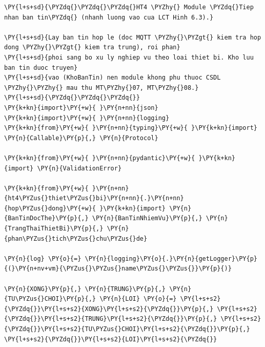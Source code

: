 \begin{Verbatim}[commandchars=\\\{\},frame=single,framerule=0.3pt,rulecolor=\color{black!40},fontsize=\footnotesize,breaklines=true]
\PY{l+s+sd}{\PYZdq{}\PYZdq{}\PYZdq{}HT4 \PYZhy{} Module \PYZdq{}Tiep nhan ban tin\PYZdq{} (nhanh luong vao cua LCT Hinh 6.3).}

\PY{l+s+sd}{Lay ban tin hop le (doc MQTT \PYZhy{}\PYZgt{} kiem tra hop dong \PYZhy{}\PYZgt{} kiem tra trung), roi phan}
\PY{l+s+sd}{phoi sang bo xu ly nghiep vu theo loai thiet bi. Kho luu ban tin duoc truyen}
\PY{l+s+sd}{vao (KhoBanTin) nen module khong phu thuoc CSDL \PYZhy{}\PYZhy{} mau thu MT\PYZhy{}07, MT\PYZhy{}08.}
\PY{l+s+sd}{\PYZdq{}\PYZdq{}\PYZdq{}}
\PY{k+kn}{import}\PY{+w}{ }\PY{n+nn}{json}
\PY{k+kn}{import}\PY{+w}{ }\PY{n+nn}{logging}
\PY{k+kn}{from}\PY{+w}{ }\PY{n+nn}{typing}\PY{+w}{ }\PY{k+kn}{import} \PY{n}{Callable}\PY{p}{,} \PY{n}{Protocol}

\PY{k+kn}{from}\PY{+w}{ }\PY{n+nn}{pydantic}\PY{+w}{ }\PY{k+kn}{import} \PY{n}{ValidationError}

\PY{k+kn}{from}\PY{+w}{ }\PY{n+nn}{ht4\PYZus{}thiet\PYZus{}bi}\PY{n+nn}{.}\PY{n+nn}{hop\PYZus{}dong}\PY{+w}{ }\PY{k+kn}{import} \PY{n}{BanTinDocThe}\PY{p}{,} \PY{n}{BanTinNhiemVu}\PY{p}{,} \PY{n}{TrangThaiThietBi}\PY{p}{,} \PY{n}{phan\PYZus{}tich\PYZus{}chu\PYZus{}de}

\PY{n}{log} \PY{o}{=} \PY{n}{logging}\PY{o}{.}\PY{n}{getLogger}\PY{p}{(}\PY{n+nv+vm}{\PYZus{}\PYZus{}name\PYZus{}\PYZus{}}\PY{p}{)}

\PY{n}{XONG}\PY{p}{,} \PY{n}{TRUNG}\PY{p}{,} \PY{n}{TU\PYZus{}CHOI}\PY{p}{,} \PY{n}{LOI} \PY{o}{=} \PY{l+s+s2}{\PYZdq{}}\PY{l+s+s2}{XONG}\PY{l+s+s2}{\PYZdq{}}\PY{p}{,} \PY{l+s+s2}{\PYZdq{}}\PY{l+s+s2}{TRUNG}\PY{l+s+s2}{\PYZdq{}}\PY{p}{,} \PY{l+s+s2}{\PYZdq{}}\PY{l+s+s2}{TU\PYZus{}CHOI}\PY{l+s+s2}{\PYZdq{}}\PY{p}{,} \PY{l+s+s2}{\PYZdq{}}\PY{l+s+s2}{LOI}\PY{l+s+s2}{\PYZdq{}}



\end{Verbatim}
